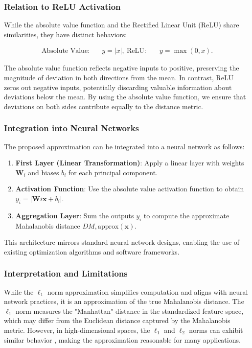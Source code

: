 \subsubsection{Relation to ReLU Activation}

While the absolute value function and the Rectified Linear Unit (ReLU) share similarities, they have distinct behaviors:

\begin{align} \text{Absolute Value}: \quad & y = | x |, \ \text{ReLU}: \quad & y = \max(0, x). \end{align}

The absolute value function reflects negative inputs to positive, preserving the magnitude of deviation in both directions from the mean. In contrast, ReLU zeros out negative inputs, potentially discarding valuable information about deviations below the mean. By using the absolute value function, we ensure that deviations on both sides contribute equally to the distance metric.

\subsubsection{Integration into Neural Networks}

The proposed approximation can be integrated into a neural network as follows:

\begin{enumerate} \item \textbf{First Layer (Linear Transformation)}: Apply a linear layer with weights $\mathbf{W}_i$ and biases $b_i$ for each principal component. \item \textbf{Activation Function}: Use the absolute value activation function to obtain $y_i = | \mathbf{W}i \mathbf{x} + b_i |$. \item \textbf{Aggregation Layer}: Sum the outputs $y_i$ to compute the approximate Mahalanobis distance $D{M, \text{approx}}(\mathbf{x})$. \end{enumerate}

This architecture mirrors standard neural network designs, enabling the use of existing optimization algorithms and software frameworks.

\subsubsection{Interpretation and Limitations}

While the $\ell_1$ norm approximation simplifies computation and aligns with neural network practices, it is an approximation of the true Mahalanobis distance. The $\ell_1$ norm measures the "Manhattan" distance in the standardized feature space, which may differ from the Euclidean distance captured by the Mahalanobis metric. However, in high-dimensional spaces, the $\ell_1$ and $\ell_2$ norms can exhibit similar behavior \cite{indyk1998approximate}, making the approximation reasonable for many applications.


